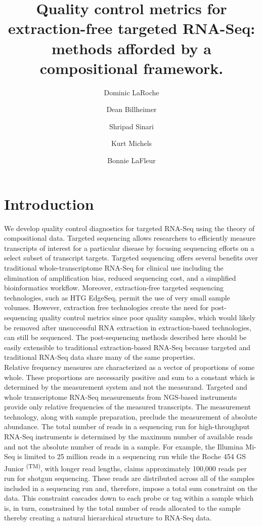 \documentclass{article}\usepackage[]{graphicx}\usepackage[]{color}
\title{Quality control metrics for extraction-free targeted RNA-Seq: methods afforded by a compositional framework.}
\author{Dominic LaRoche \and Dean Billheimer \and Shripad Sinari \and Kurt Michels \and  Bonnie LaFleur}
\theoremstyle{definition}
\begin{document}
\maketitle

\doublespacing


\section{Introduction}


We develop quality control diagnostics for targeted RNA-Seq using the theory of compositional data.  Targeted sequencing allows researchers to efficiently measure transcripts of interest for a particular disease by focusing sequencing efforts on a select subset of transcript targets.  Targeted sequencing offers several benefits over traditional whole-transcriptome RNA-Seq for clinical use including the elimination of amplification bias, reduced sequencing cost, and a simplified bioinformatics workflow.  Moreover, extraction-free targeted sequencing technologies, such as HTG EdgeSeq, permit the use of very small sample volumes. However, extraction free technologies create the need for post-sequencing quality control metrics since poor quality samples, which would likely be removed after unsuccessful RNA extraction in extraction-based technologies, can still be sequenced.  The post-sequencing methods described here should be easily extensible to traditional extraction-based RNA-Seq because targeted and traditional RNA-Seq data share many of the same properties.\\


Relative frequency measures are characterized as a vector of proportions of some whole.  These proportions are necessarily positive and sum to a constant which is determined by the measurement system and not the measurand.  
Targeted and whole transcriptome RNA-Seq measurements from NGS-based instruments provide only relative frequencies of the measured transcripts.  The measurement technology, along with sample preparation, preclude the measurement of absolute abundance. The total number of reads in a sequencing run for high-throughput RNA-Seq instruments is determined by the maximum number of available reads  and not the absolute number of reads in a sample.  For example, the Illumina Mi-Seq is limited to 25 million reads in a sequencing run while the Roche 454 GS Junior \textsuperscript{(TM)}, with longer read lengths, claims approximately 100,000 reads per run for shotgun sequencing.  These reads are distributed across all of the samples included in a sequencing run and, therefore, impose a total sum constraint on the data.  This constraint cascades down to each probe or tag within a sample which is, in turn, constrained by the total number of reads allocated to the sample thereby creating a natural hierarchical structure to RNA-Seq data.\\
\end{document}
